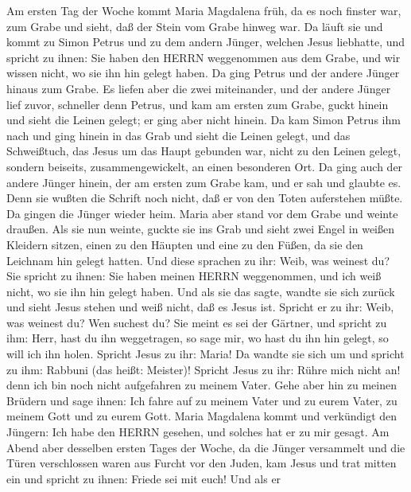  Am ersten Tag der Woche kommt Maria Magdalena früh, da es
noch finster war, zum Grabe und sieht, daß der Stein vom Grabe hinweg
war.  Da läuft sie und kommt zu Simon Petrus und zu dem
andern Jünger, welchen Jesus liebhatte, und spricht zu ihnen: Sie haben
den HERRN weggenommen aus dem Grabe, und wir wissen nicht, wo sie ihn
hin gelegt haben.  Da ging Petrus und der andere Jünger
hinaus zum Grabe.  Es liefen aber die zwei miteinander, und
der andere Jünger lief zuvor, schneller denn Petrus, und kam am ersten
zum Grabe,  guckt hinein und sieht die Leinen gelegt; er
ging aber nicht hinein.  Da kam Simon Petrus ihm nach und
ging hinein in das Grab und sieht die Leinen gelegt,  und
das Schweißtuch, das Jesus um das Haupt gebunden war, nicht zu den
Leinen gelegt, sondern beiseits, zusammengewickelt, an einen besonderen
Ort.  Da ging auch der andere Jünger hinein, der am ersten
zum Grabe kam, und er sah und glaubte es.  Denn sie wußten
die Schrift noch nicht, daß er von den Toten auferstehen müßte.
 Da gingen die Jünger wieder heim.  Maria aber
stand vor dem Grabe und weinte draußen. Als sie nun weinte, guckte sie
ins Grab  und sieht zwei Engel in weißen Kleidern sitzen,
einen zu den Häupten und eine zu den Füßen, da sie den Leichnam hin
gelegt hatten.  Und diese sprachen zu ihr: Weib, was
weinest du? Sie spricht zu ihnen: Sie haben meinen HERRN weggenommen,
und ich weiß nicht, wo sie ihn hin gelegt haben.  Und als
sie das sagte, wandte sie sich zurück und sieht Jesus stehen und weiß
nicht, daß es Jesus ist.  Spricht er zu ihr: Weib, was
weinest du? Wen suchest du? Sie meint es sei der Gärtner, und spricht zu
ihm: Herr, hast du ihn weggetragen, so sage mir, wo hast du ihn hin
gelegt, so will ich ihn holen.  Spricht Jesus zu ihr:
Maria! Da wandte sie sich um und spricht zu ihm: Rabbuni (das heißt:
Meister)!  Spricht Jesus zu ihr: Rühre mich nicht an! denn
ich bin noch nicht aufgefahren zu meinem Vater. Gehe aber hin zu meinen
Brüdern und sage ihnen: Ich fahre auf zu meinem Vater und zu eurem
Vater, zu meinem Gott und zu eurem Gott.  Maria Magdalena
kommt und verkündigt den Jüngern: Ich habe den HERRN gesehen, und
solches hat er zu mir gesagt.  Am Abend aber desselben
ersten Tages der Woche, da die Jünger versammelt und die Türen
verschlossen waren aus Furcht vor den Juden, kam Jesus und trat mitten
ein und spricht zu ihnen: Friede sei mit euch!  Und als er

